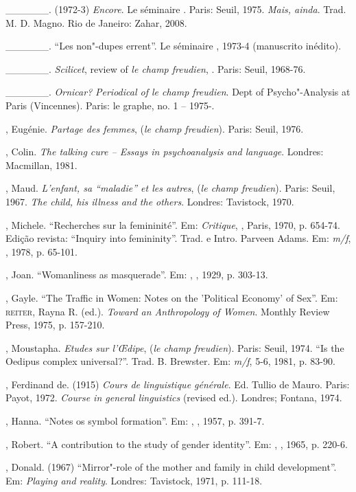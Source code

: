 \begin{Parskip}
\_\_\_\_\_\_. (1972-3) \emph{Encore}. Le séminaire . Paris: Seuil, 1975.
\emph{Mais, ainda}. Trad. M. D. Magno. Rio de Janeiro: Zahar, 2008.

\_\_\_\_\_\_. ``Les non"-dupes errent''. Le séminaire , 1973-4 (manuscrito
inédito).

\_\_\_\_\_\_. \emph{Scilicet}, review of \emph{le champ freudien}, .
Paris: Seuil, 1968-76.

\_\_\_\_\_\_. \emph{Ornicar?} \emph{Periodical of le champ freudien}. Dept
of Psycho"-Analysis at Paris  (Vincennes). Paris: le graphe, no. 1 --
1975-. %

, Eugénie. \emph{Partage des femmes}, (\emph{le champ freudien}).
Paris: Seuil, 1976.

, Colin. \emph{The talking cure -- Essays in psychoanalysis and
language}. Londres: Macmillan, 1981.

, Maud. \emph{L'enfant, sa ``maladie'' et les autres}, (\emph{le champ
freudien}). Paris: Seuil, 1967. \emph{The child, his illness and the
others}. Londres: Tavistock, 1970.

, Michele. ``Recherches sur la femininité''. Em: \emph{Critique}, ,
Paris, 1970, p. 654-74. Edição revista: ``Inquiry into femininity''.
Trad. e Intro. Parveen Adams. Em: \emph{m/f}, , 1978, p. 65-101.

, Joan. ``Womanliness as masquerade''. Em: \emph{}, , 1929, p. 303-13.

, Gayle. ``The Traffic in Women: Notes on the 'Political Economy' of
Sex''. Em: \textsc{reiter}, Rayna R. (ed.). \emph{Toward an Anthropology of
Women}. Monthly Review Press, 1975, p. 157-210.

, Moustapha. \emph{Etudes sur l'\OE dipe}, (\emph{le champ freudien}).
Paris: Seuil, 1974. ``Is the Oedipus complex universal?''. Trad. B. Brewster. Em: \emph{m/f}, 5-6, 1981, p. 83-90.

, Ferdinand de. (1915) \emph{Cours de linguistique générale}. Ed.
Tullio de Mauro. Paris: Payot, 1972. \emph{Course in general
linguistics} (revised ed.). Londres; Fontana, 1974.

, Hanna. ``Notes os symbol formation''. Em: \emph{}, , 1957, p. 391-7.

, Robert. ``A contribution to the study of gender identity''. Em:
\emph{}, , 1965, p. 220-6.

, Donald. (1967) ``Mirror"-role of the mother and family in child
development''. Em: \emph{Playing and reality}. Londres: Tavistock, 1971, p. 111-18.
\end{Parskip}



